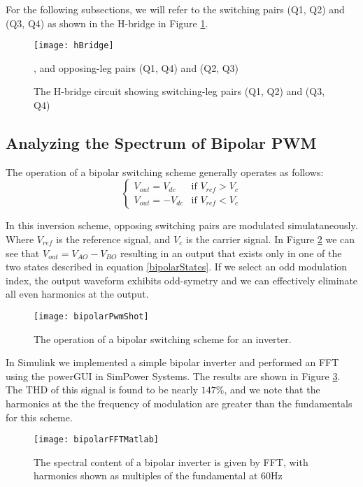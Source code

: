 For the following subsections, we will refer to the switching pairs (Q1, Q2) and (Q3, Q4) as shown in the H-bridge in Figure \ref{hBridge}.

\begin{figure}
\centering
\texttt{[image: hBridge]}
\caption{The H-bridge circuit showing switching-leg pairs (Q1, Q2) and (Q3, Q4)}, and opposing-leg pairs (Q1, Q4) and (Q2, Q3)
\label{hBridge}
\end{figure}


\subsection{Analyzing the Spectrum of Bipolar PWM}
The operation of a bipolar switching scheme generally operates as follows:
\begin{equation}
\begin{cases}
\label{bipolarStates}
V_{out} = V_{dc} &\mbox{if $V_{ref} > V_{c}$} \\
V_{out} = -V_{dc} &\mbox{if $V_{ref} < V_{c}$}
\end{cases}
\end{equation}

In this inversion scheme, opposing switching pairs are modulated simulataneously. 
Where $V_{ref}$ is the reference signal, and $V_c$ is the carrier signal. In Figure \ref{bipolarSwitchingOperation} we can see that $V_{out} = V_{AO}-V_{BO}$ resulting in an output that exists only in one of the two states described in equation \ref{bipolarStates}. If we select an odd modulation index, the output waveform exhibits odd-symetry and we can effectively eliminate all even harmonics at the output.

\begin{figure}
\centering
\texttt{[image: bipolarPwmShot]}
\caption{The operation of a bipolar switching scheme for an inverter.\cite{FourierAnalysis}} 
\label{bipolarSwitchingOperation}
\end{figure}

In Simulink we implemented a simple bipolar inverter and performed an FFT using the powerGUI in SimPower Systems. The results are shown in Figure \ref{bipolarFFTMatlab}. The THD of this signal is found to be nearly $147\%$, and we note that the harmonics at the the frequency of modulation are greater than the fundamentals for this scheme.

\begin{figure}
\centering
\texttt{[image: bipolarFFTMatlab]}
\caption{The spectral content of a bipolar inverter is given by FFT, with harmonics shown as multiples of the fundamental at 60Hz}
\label{bipolarFFTMatlab}
\end{figure}

